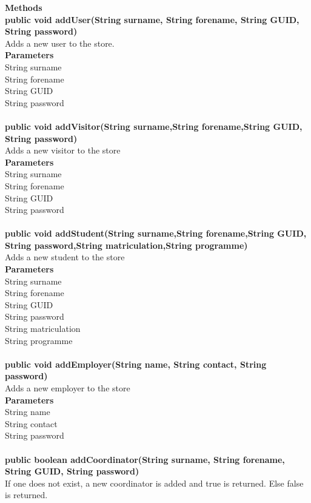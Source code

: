 \documentclass{l3deliverable}
\begin{document}
\textbf{Methods}\\
\textbf{public void addUser(String surname, String forename, String GUID, String password)}\\
Adds a new user to the store.\\
\textbf{Parameters}\\
String surname\\
String forename\\
String GUID\\
String password\\
\\
\textbf{public void addVisitor(String surname,String forename,String GUID, String password)}\\
Adds a new visitor to the store\\
\textbf{Parameters}\\
String surname\\
String forename\\
String GUID\\
String password\\
\\
\textbf{public void addStudent(String surname,String forename,String GUID, String password,String matriculation,String programme)}\\
Adds a new student to the store\\
\textbf{Parameters}\\
String surname\\
String forename\\
String GUID\\
String password\\
String matriculation\\
String programme\\
\\
\textbf{public void addEmployer(String name, String contact, String password)}\\
Adds a new employer to the store\\
\textbf{Parameters}\\
String name\\
String contact\\
String password\\
\\
\textbf{public boolean addCoordinator(String surname, String forename, String GUID, String password)}\\
If one does not exist, a new coordinator is added and true is returned. Else false is returned.
\end{document}
